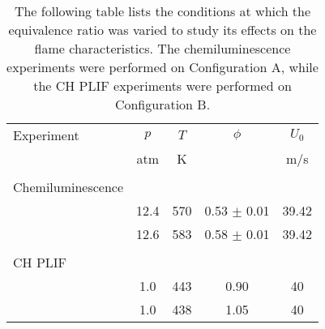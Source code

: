 \begin{table}
  \caption[Test conditions for studying equivalence ratio effects]{The following table lists the conditions at which the equivalence ratio was varied to study its effects on the flame characteristics. The chemiluminescence experiments were performed on Configuration A, while the CH PLIF experiments were performed on Configuration B.}
  \begin{center}
    \begin{tabular}{lcccc}
      Experiment & \(p\) & \(T\) & \(\phi\) & \(U_0\) \tabularnewline
      & atm & K & & m/s \tabularnewline
      \hline\hline
      & & & & \tabularnewline
      Chemiluminescence & & & & \tabularnewline
      \hline
      & 12.4 & 570 & 0.53 \(\pm\) 0.01 & 39.42 \tabularnewline
      & 12.6 & 583 & 0.58 \(\pm\) 0.01 & 39.42 \tabularnewline
      & & & & \tabularnewline
      CH PLIF & & & & \tabularnewline
      \hline
      & 1.0 & 443 & 0.90 & 40 \tabularnewline
      & 1.0 & 438 & 1.05 & 40 \tabularnewline
      \hline
    \end{tabular}
  \end{center}
  \label{tab:equivalenceRatioCases}
\end{table}

